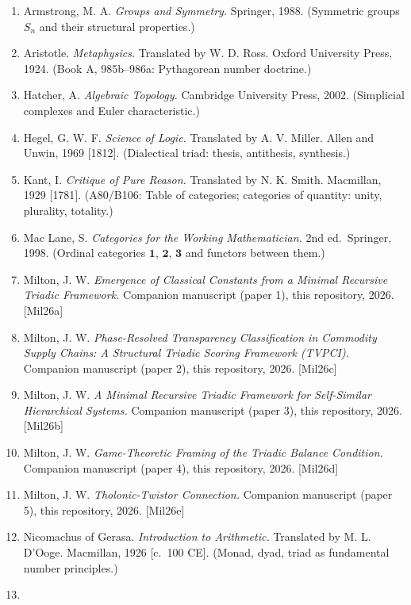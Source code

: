 \documentclass[
  11pt,
  letterpaper,
]{article}
\providecommand{\tightlist}{%
  \setlength{\itemsep}{0pt}\setlength{\parskip}{0pt}}
\begin{document}
\begin{enumerate}
\def\labelenumi{\arabic{enumi}.}
\tightlist
\item
  Armstrong, M. A. \emph{Groups and Symmetry.} Springer, 1988.
  (Symmetric groups \(S_n\) and their structural properties.)
\item
  Aristotle. \emph{Metaphysics.} Translated by W. D. Ross. Oxford
  University Press, 1924. (Book A, 985b--986a: Pythagorean number
  doctrine.)
\item
  Hatcher, A. \emph{Algebraic Topology.} Cambridge University Press,
  2002. (Simplicial complexes and Euler characteristic.)
\item
  Hegel, G. W. F. \emph{Science of Logic.} Translated by A. V. Miller.
  Allen and Unwin, 1969 {[}1812{]}. (Dialectical triad: thesis,
  antithesis, synthesis.)
\item
  Kant, I. \emph{Critique of Pure Reason.} Translated by N. K. Smith.
  Macmillan, 1929 {[}1781{]}. (A80/B106: Table of categories; categories
  of quantity: unity, plurality, totality.)
\item
  Mac Lane, S. \emph{Categories for the Working Mathematician.} 2nd
  ed.~Springer, 1998. (Ordinal categories \(\mathbf{1}\),
  \(\mathbf{2}\), \(\mathbf{3}\) and functors between them.)
\item
  Milton, J. W. \emph{Emergence of Classical Constants from a Minimal
  Recursive Triadic Framework.} Companion manuscript (paper 1), this
  repository, 2026. {[}Mil26a{]}
\item
  Milton, J. W. \emph{Phase-Resolved Transparency Classification in
  Commodity Supply Chains: A Structural Triadic Scoring Framework
  (TVPCI).} Companion manuscript (paper 2), this repository, 2026.
  {[}Mil26c{]}
\item
  Milton, J. W. \emph{A Minimal Recursive Triadic Framework for
  Self-Similar Hierarchical Systems.} Companion manuscript (paper 3),
  this repository, 2026. {[}Mil26b{]}
\item
  Milton, J. W. \emph{Game-Theoretic Framing of the Triadic Balance
  Condition.} Companion manuscript (paper 4), this repository, 2026.
  {[}Mil26d{]}
\item
  Milton, J. W. \emph{Tholonic-Twistor Connection.} Companion manuscript
  (paper 5), this repository, 2026. {[}Mil26e{]}
\item
  Nicomachus of Gerasa. \emph{Introduction to Arithmetic.} Translated by
  M. L. D'Ooge. Macmillan, 1926 {[}c.~100 CE{]}. (Monad, dyad, triad as
  fundamental number principles.)
\item

\end{enumerate}
\end{document}
